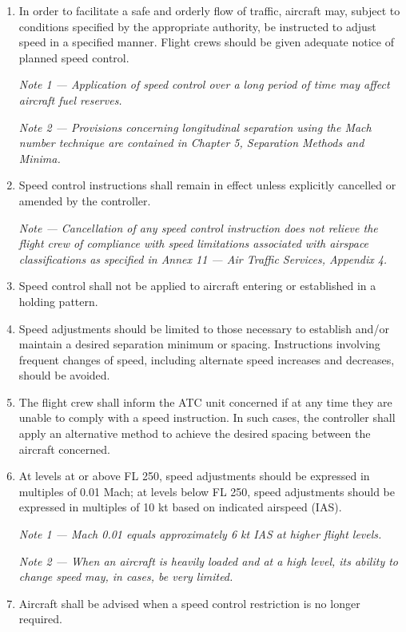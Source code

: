 \documentclass[../main.tex]{subfiles}
\begin{document}
    \begin{enumerate}
        \item In order to facilitate a safe and orderly flow of traffic, aircraft may, subject to conditions specified by the appropriate authority, be instructed to adjust speed in a specified manner. Flight crews should be given adequate notice of planned speed control.

        \textit{Note 1 --- Application of speed control over a long period of time may affect aircraft fuel reserves.}

        \textit{Note 2 --- Provisions concerning longitudinal separation using the Mach number technique are contained in Chapter 5, Separation Methods and Minima.}

        \item Speed control instructions shall remain in effect unless explicitly cancelled or amended by the controller.

        \textit{Note --- Cancellation of any speed control instruction does not relieve the flight crew of compliance with speed limitations associated with airspace classifications as specified in Annex 11 — Air Traffic Services, Appendix 4.}

        \item Speed control shall not be applied to aircraft entering or established in a holding pattern.
        \item Speed adjustments should be limited to those necessary to establish and/or maintain a desired separation minimum or spacing. Instructions involving frequent changes of speed, including alternate speed increases and decreases, should be avoided.
        \item The flight crew shall inform the ATC unit concerned if at any time they are unable to comply with a speed instruction. In such cases, the controller shall apply an alternative method to achieve the desired spacing between the aircraft concerned.
        \item At levels at or above FL 250, speed adjustments should be expressed in multiples of 0.01 Mach; at levels below FL 250, speed adjustments should be expressed in multiples of 10 kt based on indicated airspeed (IAS).

        \textit{Note 1 --- Mach 0.01 equals approximately 6 kt IAS at higher flight levels.}

        \textit{Note 2 --- When an aircraft is heavily loaded and at a high level, its ability to change speed may, in cases, be very limited.}

        \item Aircraft shall be advised when a speed control restriction is no longer required.
    \end{enumerate}
\end{document}
